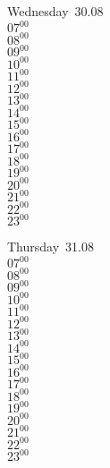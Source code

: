 \documentclass[11pt, a4paper]{book}\usepackage[]{graphicx}\usepackage[]{color}
\begin{document}
\begin{weekdaybox}
  Wednesday~30.08\\
  { 
  \vfill
  $07^{00}$\\
$08^{00}$\\
$09^{00}$\\
$10^{00}$\\
$11^{00}$\\
$12^{00}$\\
$13^{00}$\\
$14^{00}$\\
$15^{00}$\\
$16^{00}$\\
$17^{00}$\\
$18^{00}$\\
$19^{00}$\\
$20^{00}$\\
$21^{00}$\\
$22^{00}$\\
$23^{00}$\\
  }
\end{weekdaybox}
\clearpage
\begin{headerbox}
\end{headerbox}
\begin{weekdaybox}
  Thursday~31.08\\
  { 
  \vfill
  $07^{00}$\\
$08^{00}$\\
$09^{00}$\\
$10^{00}$\\
$11^{00}$\\
$12^{00}$\\
$13^{00}$\\
$14^{00}$\\
$15^{00}$\\
$16^{00}$\\
$17^{00}$\\
$18^{00}$\\
$19^{00}$\\
$20^{00}$\\
$21^{00}$\\
$22^{00}$\\
$23^{00}$\\
  }
\end{weekdaybox} 
\end{document}
